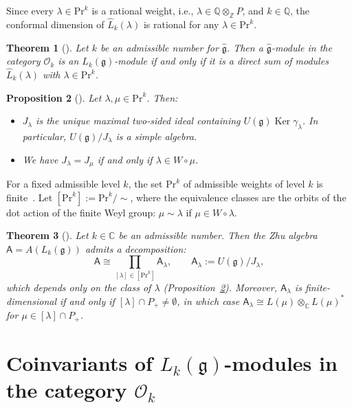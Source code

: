 \documentclass[12pt,a4paper,reqno]{amsart}
\numberwithin{equation}{section}
\newtheorem{theorem}{Theorem}[section]
\newtheorem{proposition}[theorem]{Proposition}
\theoremstyle{definition}
\newcommand{\g}{\mathfrak{g}}
\renewcommand{\ker}{\operatorname{Ker}}
\newcommand{\C}{\mathbb{C}}
\newcommand{\Z}{\mathbb{Z}}
\newcommand{\Q}{\mathbb{Q}}
\def\O{\mathcal{O}}
\def\Pr{\mathrm{Pr}}
\def\la{\lambda}
\def\o{\otimes}
\def\A{\mathsf{A}}
\begin{document}
Since every $\la\in \Pr^k$ is a rational weight, i.e., $\la\in \Q\o_\Z P$, and $k\in\Q$, the conformal dimension of $\hat{L}_k(\la)$ is rational for any $\la \in \Pr^k$.
\begin{theorem}[{\cite[Main theorem]{A16}}]\label{thm:Aramain}
    Let $k$ be an admissible number for $\hat{\g}$. Then a $\hat{\g}$-module in the category $\O_k$ is an $L_k(\g)$-module if and only if it is a direct sum of modules $\hat{L}_k(\la)$ with $\la\in \Pr^k$.
\end{theorem}







\begin{proposition}[{\cite[Proposition 2.4]{arakawa2017weight}}]\label{prop:arakawa_primitive}
    Let $\la,\mu \in \Pr^k$. Then:
    \begin{itemize}
        \item $J_\la$ is the unique maximal two-sided ideal containing $U(\g)\ker \gamma_\la$. In particular, $U(\g)/J_\la$ is a simple algebra.
        \item We have $J_\la = J_\mu$ if and only if $\la \in W \circ \mu$.
    \end{itemize}
\end{proposition}
For a fixed admissible level $k$, the set $\Pr^k$ of admissible weights of level $k$ is finite~\cite{kac1989classification}.
Let $[\Pr^k]:= \Pr^k/\sim$, where the equivalence classes are the orbits of the dot action of the finite Weyl group: $\mu \sim \la$ if $\mu \in W\circ\la$.
\begin{theorem}[{\cite[Theorem 3.4]{AvE}}]\label{thm:AvE_result}
Let $k\in\C$ be an admissible number.
Then the Zhu algebra $  \A = A(L_k(\g)) $ admits a decomposition:
\begin{equation}\label{eq:admAV}
\A \cong \prod_{[\la] \in [\Pr^k]} \A_\la, \qquad \A_\la:=U(\g)/J_\la,
\end{equation}
which depends only on the class of $\la$ (Proposition~\ref{prop:arakawa_primitive}). Moreover, $\A_\la$ is finite-dimensional if and
only if $[\la]\cap P_+\neq\emptyset$, in which case $\A_\la\cong L(\mu)\otimes_\C L(\mu)^\ast$
for $\mu\in[\la]\cap P_+$.
\end{theorem}








\section{Coinvariants of $L_k(\g)$-modules in the category $\O_k$}\label{sec:fusion}
\end{document}
